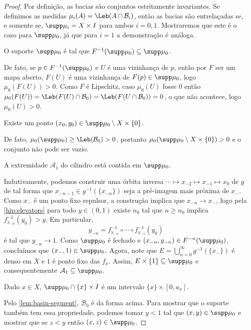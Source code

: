 \documentclass[../fapesp0]{subfiles}
\begin{document}
\begin{proof}
  Por definição, as bacias são conjuntos estritamente invariantes. Se definimos as medidas \(\mu_i(A) = \Leb(A \cap \mathcal{B}_i)\), então as bacias são entrelaçadas se, e somente se, \(\supp \mu_i = X \times I\) para ambos \(i = 0,1\). Mostraremos que este é o caso para \(\supp \mu_0\), já que para \(i = 1\) a demonstração é análoga.

  \begin{claim}
    O suporte \(\supp \mu_0\) é tal que \(F ^{-1}(\supp \mu_0) \subseteq \supp \mu_0\).
  \end{claim}
  De fato, se \(p \in F^{-1}(\supp \mu_0)\) e \(U\) é uma vizinhança de \(p\), então por \(F\) ser um mapa aberto, \(F(U)\) é uma vizinhança de \(F(p) \in \supp \mu_0\), logo \(\mu_0(F(U)) > 0\). Como \(F\) é Lipschitz, caso \(\mu_0(U)\) fosse \(0\) então \(\mu_0(F(U)) =\Leb(F(U) \cap \mathcal{B}_0) = \Leb(F(U \cap \mathcal{B}_0)) = 0\), o que não acontece, logo \(\mu_0(U) > 0\).

  \begin{claim}
    Existe um ponto \((x_0,y_0) \in \supp \mu_0 \setminus X \times \{ 0 \}\).
  \end{claim}
  De fato, \(\mu_0(\supp \mu_0) \geq \Leb(\mathcal{B}_0) > 0\), portanto \(\mu_0(\supp \mu_0 \setminus X \times \{ 0 \}) > 0\) e o conjunto não pode ser vazio.

  \begin{claim}
    A extremidade \(\mathcal{A}_1\) do cilindro está contida em \(\supp \mu_0\).
  \end{claim}
  Indutivamente, podemos construir uma órbita inversa \(\cdots \mapsto x_{-2} \mapsto x_{-1} \mapsto x_0\) de \(g\) de tal forma que \(x_{ - n - 1} \in g^{-1}(\{ x_{-n} \})\) seja a pré-imagem mais próxima de \(x_-\). Como \(x_-\) é um ponto fixo repulsor, a construção implica que \(x_{-n} \to x_-\), logo pela \cref{hip:elevators}  para todo \(y \in (0,1)\) existe \(n_0\) tal que \(n \geq n_0\) implica \(f_{x_{-n}}^{-1}(y_0) > y\). Em particular,
  \[y_{ - n} = f_{x_{-n}}^{-1} \circ \cdots \circ f_{x_{-1}}^{-1}(y_0)\]
  é tal que \(y_{ - n} \to 1\). Como \(\supp \mu_0\) é fechado e \((x_{ - n},y_{ - n}) \in F^{-n}(\supp \mu_0)\), concluímos que \((x_-, 1) \in \supp \mu_0\). Agora, note que \(E = \bigcup_{n = 0}^{\infty}g ^{-1}(\{ x_- \})\) é denso em \(X\) e \(1\) é ponto fixo das \(f_x\). Assim, \(E \times \{ 1 \} \subseteq \supp \mu_0\) e consequentemente \(\mathcal{A}_1 \subseteq \supp \mu_0\).
  
  \begin{claim}
    Dado \(x \in X\), \(\supp \mu_0 \cap \{ x \} \times I\) é um intervalo \(\{ x \} \times [0,a_x]\).
  \end{claim}
  Pelo \cref{lem:basin-segment}, \(\mathcal{B}_0\) é da forma acima. Para mostrar que o suporte também tem essa propriedade, podemos tomar \(y < 1\) tal que \((x,y) \in \supp \mu_0\) e mostrar que se \(z < y\) então \((x,z) \in \supp \mu_0\).


\end{proof}
\end{document}
